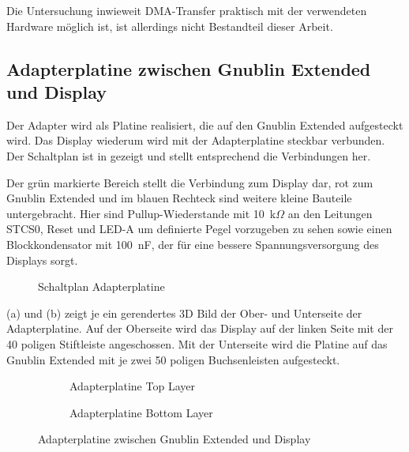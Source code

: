 Die Untersuchung inwieweit DMA-Transfer praktisch mit der verwendeten Hardware möglich ist, ist allerdings nicht Bestandteil dieser Arbeit. 

\newpage
\subsection{Adapterplatine zwischen Gnublin Extended und Display}
Der Adapter wird als Platine realisiert, die auf den Gnublin Extended aufgesteckt wird. Das Display wiederum wird mit der Adapterplatine steckbar verbunden. Der Schaltplan ist in  gezeigt und stellt entsprechend  die Verbindungen her.

Der grün markierte Bereich stellt die Verbindung zum Display dar, rot zum Gnublin Extended und im blauen Rechteck sind weitere kleine Bauteile untergebracht. Hier sind Pullup-Wiederstande mit 10~k$\Omega$ an den Leitungen STCS0, Reset und LED-A um definierte Pegel vorzugeben zu sehen sowie einen Blockkondensator mit 100~nF, der für eine bessere Spannungsversorgung des Displays sorgt.

\begin{figure}[tbph]
	\centering
{}
	\caption{Schaltplan Adapterplatine}
	\label{fig:adapterplatine_sch}
\end{figure}
\newpage

 (a) und (b) zeigt je ein gerendertes 3D Bild der Ober- und Unterseite der Adapterplatine. Auf der Oberseite wird das Display auf der linken Seite mit der 40 poligen Stiftleiste angeschossen. Mit der Unterseite wird die Platine auf das Gnublin Extended mit je zwei 50 poligen Buchsenleisten aufgesteckt.

\begin{figure}
        \begin{center}
        \begin{subfigure}[htp]{0.8\textwidth}
                \caption{Adapterplatine Top Layer}
                \label{fig:adapter_top}
        \end{subfigure}

        \begin{subfigure}[htp]{0.8\textwidth}
                             				\caption{Adapterplatine Bottom Layer}
                \label{fig:adapter_bot}
        \end{subfigure}
		\end{center}
        \caption{Adapterplatine zwischen Gnublin Extended und Display}\label{fig:adapterplatine}
\end{figure}

